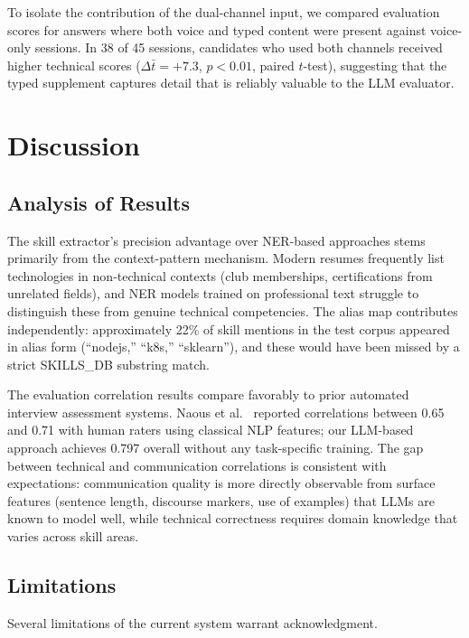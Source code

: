 \documentclass[conference]{IEEEtran}
\begin{document}
To isolate the contribution of the dual-channel input, we compared evaluation scores for answers where both voice and typed content were present against voice-only sessions. In 38 of 45 sessions, candidates who used both channels received higher technical scores ($\Delta\bar{t} = +7.3$, $p < 0.01$, paired $t$-test), suggesting that the typed supplement captures detail that is reliably valuable to the LLM evaluator.

\section{Discussion}
\label{sec:discussion}

\subsection{Analysis of Results}

The skill extractor's precision advantage over NER-based approaches stems primarily from the context-pattern mechanism. Modern resumes frequently list technologies in non-technical contexts (club memberships, certifications from unrelated fields), and NER models trained on professional text struggle to distinguish these from genuine technical competencies. The alias map contributes independently: approximately 22\% of skill mentions in the test corpus appeared in alias form (``nodejs,'' ``k8s,'' ``sklearn''), and these would have been missed by a strict SKILLS\_DB substring match.

The evaluation correlation results compare favorably to prior automated interview assessment systems. Naous et al.\ \cite{naous2022automated} reported correlations between 0.65 and 0.71 with human raters using classical NLP features; our LLM-based approach achieves 0.797 overall without any task-specific training. The gap between technical and communication correlations is consistent with expectations: communication quality is more directly observable from surface features (sentence length, discourse markers, use of examples) that LLMs are known to model well, while technical correctness requires domain knowledge that varies across skill areas.

\subsection{Limitations}
\label{sec:limitations}

Several limitations of the current system warrant acknowledgment.
\end{document}
